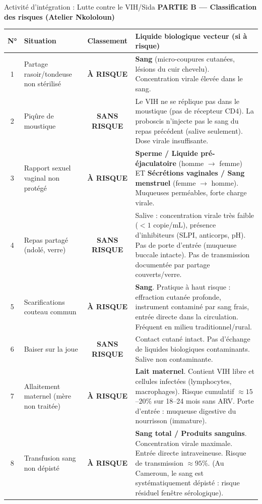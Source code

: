 \documentclass[11pt]{article}
\begin{document}
\begin{exoresolu}{Activité d'intégration : Lutte contre le VIH/Sida}
\textbf{PARTIE B — Classification des risques (Atelier Nkololoun)}

\begin{center}
\begin{tabularx}{\linewidth}{|c|X|c|X|}
\hline
\rowcolor{popblueL}
\textbf{N°} & \textbf{Situation} & \textbf{Classement} & \textbf{Liquide biologique vecteur (si à risque)} \\
\hline
1 & Partage rasoir/tondeuse non stérilisé & \textbf{À RISQUE} & \textbf{Sang} (micro-coupures cutanées, lésions du cuir chevelu). Concentration virale élevée dans le sang. \\
\hline
2 & Piqûre de moustique & \textbf{SANS RISQUE} & Le VIH ne se réplique pas dans le moustique (pas de récepteur CD4). La proboscis n'injecte pas le sang du repas précédent (salive seulement). Dose virale insuffisante. \\
\hline
3 & Rapport sexuel vaginal non protégé & \textbf{À RISQUE} & \textbf{Sperme / Liquide pré-éjaculatoire} (homme $\rightarrow$ femme) ET \textbf{Sécrétions vaginales / Sang menstruel} (femme $\rightarrow$ homme). Muqueuses perméables, forte charge virale. \\
\hline
4 & Repas partagé (ndolé, verre) & \textbf{SANS RISQUE} & Salive : concentration virale très faible ($< 1$ copie/mL), présence d'inhibiteurs (SLPI, anticorps, pH). Pas de porte d'entrée (muqueuse buccale intacte). Pas de transmission documentée par partage couverts/verre. \\
\hline
5 & Scarifications couteau commun & \textbf{À RISQUE} & \textbf{Sang}. Pratique à haut risque : effraction cutanée profonde, instrument contaminé par sang frais, entrée directe dans la circulation. Fréquent en milieu traditionnel/rural. \\
\hline
6 & Baiser sur la joue & \textbf{SANS RISQUE} & Contact cutané intact. Pas d'échange de liquides biologiques contaminants. Salive non contaminante. \\
\hline
7 & Allaitement maternel (mère non traitée) & \textbf{À RISQUE} & \textbf{Lait maternel}. Contient VIH libre et cellules infectées (lymphocytes, macrophages). Risque cumulatif $\approx 15$--$20\%$ sur 18--24 mois sans ARV. Porte d'entrée : muqueuse digestive du nourrisson (immature). \\
\hline
8 & Transfusion sang non dépisté & \textbf{À RISQUE} & \textbf{Sang total / Produits sanguins}. Concentration virale maximale. Entrée directe intraveineuse. Risque de transmission $\approx 95\%$. (Au Cameroun, le sang est systématiquement dépisté : risque résiduel fenêtre sérologique). \\

\end{tabularx}
\end{center}
\end{exoresolu}
\end{document}
